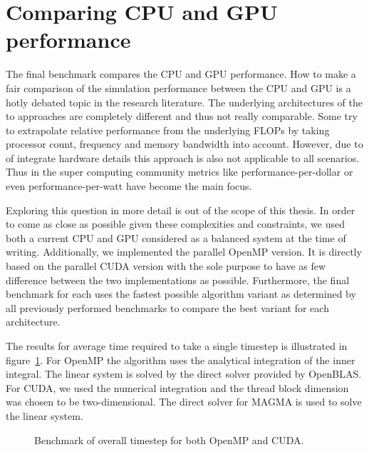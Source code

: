\documentclass[a4paper,11pt]{kth-mag}
\begin{document}
\section{Comparing CPU and GPU performance}

The final benchmark compares the CPU and GPU performance. How to make a fair comparison of the simulation performance between the CPU and GPU is a hotly debated topic in the research literature. The underlying architectures of the to approaches are completely different and thus not really comparable. Some try to extrapolate relative performance from the underlying FLOPs by taking processor count, frequency and memory bandwidth into account. However, due to of integrate hardware details this approach is also not applicable to all scenarios. Thus in the super computing community metrics like performance-per-dollar or even performance-per-watt have become the main focus.

Exploring this question in more detail is out of the scope of this thesis. In order to come as close as possible given these complexities and constraints, we used both a current CPU and GPU considered as a balanced system at the time of writing. Additionally, we implemented the parallel OpenMP version. It is directly based on the parallel CUDA version with the sole purpose to have as few difference between the two implementations as possible. Furthermore, the final benchmark for each uses the fastest possible algorithm variant as determined by all previously performed benchmarks to compare the best variant for each architecture.

The results for average time required to take a single timestep is illustrated in figure~\ref{fig:overall}. For OpenMP the algorithm uses the analytical integration of the inner integral. The linear system is solved by the direct solver provided by OpenBLAS. For CUDA, we used the numerical integration and the thread block dimension was chosen to be two-dimensional. The direct solver for MAGMA is used to solve the linear system.

\begin{figure}
  \centering
  \caption{Benchmark of overall timestep for both OpenMP and CUDA.}
  \label{fig:overall}
\end{figure}
\end{document}
